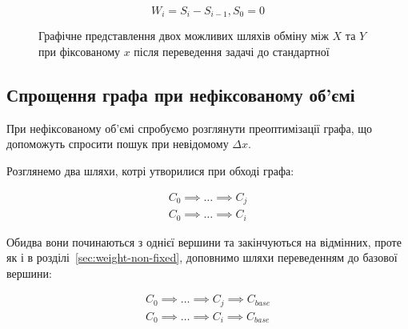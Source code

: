 \documentclass[../index.tex]{subfiles}
\begin{document}
\begin{equation*}
W_{i} = S_{i} - S_{i-1}, S_{0} = 0
\end{equation*}

\begin{figure}[h]
	\centering
	\caption{\label{fig:eval-func-graph-weight} Графічне представлення двох
	  можливих шляхів обміну між $X$ та $Y$ при фіксованому $x$ після
	  переведення задачі до стандартної}
\end{figure}

\subsection{Спрощення графа при нефіксованому об'ємі}

При нефіксованому об'ємі спробуємо розглянути преоптимізації графа, що
допоможуть спросити пошук при невідомому $\Delta x$.

Розглянемо два шляхи, котрі утворилися при обході графа:

\begin{equation*}
 \begin{aligned}
   C_{0} \implies \ldots \implies C_{j} \\
   C_{0} \implies \ldots \implies C_{i}
 \end{aligned}
\end{equation*}

Обидва вони починаються з однієї вершини та закінчуються на відмінних, проте як
і в розділі~\ref{sec:weight-non-fixed}, доповнимо шляхи переведенням до базової
вершини:

\begin{equation*}
 \begin{aligned}
   C_{0} \implies \ldots \implies C_{j} \implies C_{base}\\
   C_{0} \implies \ldots \implies C_{i} \implies C_{base}
 \end{aligned}
\end{equation*}
\end{document}
